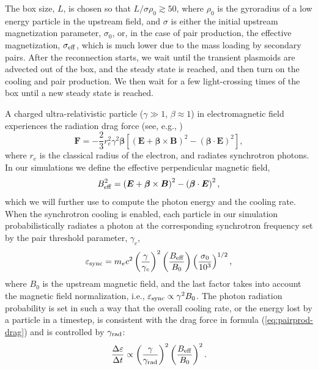 The box size, $L$, is chosen so that $L/\sigma\rho_0 \gtrsim 50$, where $\rho_0$ is the gyroradius of a low energy particle in the upstream field, and $\sigma$ is either the initial upstream magnetization parameter, $\sigma_0$, or, in the case of pair production, the effective magnetization, $\sigma_{\rm eff}$, which is much lower due to the mass loading by secondary pairs. After the reconnection starts, we wait until the transient plasmoids are advected out of the box, and the steady state is reached, and then turn on the cooling and pair production. We then wait for a few light-crossing times of the box until a new steady state is reached.

A charged ultra-relativistic particle ($\gamma\gg 1$, $\beta\approx 1$) in electromagnetic field experiences the radiation drag force (see, e.g., \citealt{1975ctf..book.....L})
\begin{equation}
\label{eq:pairprod-drag}
    \bm{F} = -\frac{2}{3}r_e^2\gamma^2\bm{\beta}\left[\left(\bm{E}+\bm{\beta}\times\bm{B}\right)^2 - \left(\bm{\beta}\cdot\bm{E}\right)^2\right],
\end{equation}
where $r_e$ is the classical radius of the electron, and radiates synchrotron photons. In our simulations we define the effective perpendicular magnetic field,
\begin{equation}
    B_{\rm eff}^2=\left(\bm{E}+\bm{\beta}\times\bm{B}\right)^2 - \left(\bm{\beta}\cdot\bm{E}\right)^2,
\end{equation}
which we will further use to compute the photon energy and the cooling rate. When the synchrotron cooling is enabled, each particle in our simulation probabilistically radiates a photon at the corresponding synchrotron frequency set by the pair threshold parameter, $\gamma_c$,
\begin{equation}
    \label{eq:pairprod-synch_form}
    \varepsilon_{\rm sync} = m_e c^2\left(\frac{\gamma}{\gamma_c}\right)^2\left(\frac{B_{\rm eff}}{B_0}\right)\left(\frac{\sigma_0}{10^3}\right)^{1/2},
\end{equation}
where $B_0$ is the upstream magnetic field, and the last factor takes into account the magnetic field normalization, i.e., $\varepsilon_{\rm sync}\propto \gamma^2 B_0$. The photon radiation probability is set in such a way that the overall cooling rate, or the energy lost by a particle in a timestep, is consistent with the drag force in formula (\ref{eq:pairprod-drag}) and is controlled by $\gamma_{\rm rad}$:
\begin{equation}
    \label{eq:pairprod-synch_rate}
    \frac{\Delta \varepsilon}{\Delta t} \propto \left(\frac{\gamma}{\gamma_{\rm rad}}\right)^2 \left(\frac{B_{\rm eff}}{B_0}\right)^2.
\end{equation}\par
